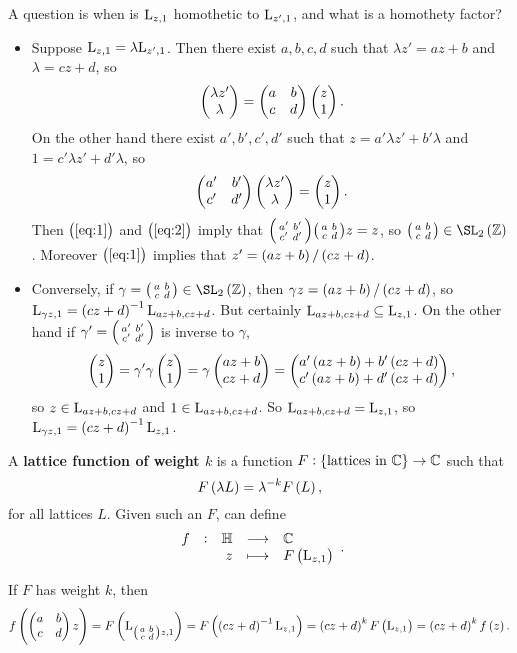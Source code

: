 A question is when is $ \mathrm{L}_{z, 1} $ homothetic to $ \mathrm{L}_{z', 1} $, and what is a homothety factor?
\begin{itemize}
\item Suppose $ \mathrm{L}_{z, 1} = \lambda \mathrm{L}_{z', 1} $. Then there exist $ a, b, c, d $ such that $ \lambda z' = az + b $ and $ \lambda = cz + d $, so
\begin{equation}
\label{eq:1}
\begin{pmatrix} \lambda z' \\ \lambda \end{pmatrix} = \begin{pmatrix} a & b \\ c & d \end{pmatrix}\begin{pmatrix} z \\ 1 \end{pmatrix}.
\end{equation}
On the other hand there exist $ a', b', c', d' $ such that $ z = a'\lambda z' + b'\lambda $ and $ 1 = c'\lambda z' + d'\lambda $, so
\begin{equation}
\label{eq:2}
\begin{pmatrix} a' & b' \\ c' & d' \end{pmatrix}\begin{pmatrix} \lambda z' \\ \lambda \end{pmatrix} = \begin{pmatrix} z \\ 1 \end{pmatrix}.
\end{equation}
Then $ \br{\ref{eq:1}} $ and $ \br{\ref{eq:2}} $ imply that $ \begin{psmallmatrix} a' & b' \\ c' & d' \end{psmallmatrix}\begin{psmallmatrix} a & b \\ c & d \end{psmallmatrix}z = z $, so $ \twobytwosmall{a}{b}{c}{d} \in \SL_2\br{\ZZ} $. Moreover $ \br{\ref{eq:1}} $ implies that $ z' = \br{az + b} / \br{cz + d} $.
\item Conversely, if $ \gamma = \twobytwosmall{a}{b}{c}{d} \in \SL_2\br{\ZZ} $, then $ \gamma z = \br{az + b} / \br{cz + d} $, so $ \L_{\gamma z, 1} = \br{cz + d}^{-1}\L_{az + b, cz + d} $. But certainly $ \mathrm{L}_{az + b, cz + d} \subseteq \mathrm{L}_{z, 1} $. On the other hand if $ \gamma' = \begin{psmallmatrix} a' & b' \\ c' & d' \end{psmallmatrix} $ is inverse to $ \gamma $,
$$ \twobyone{z}{1} = \gamma'\gamma\twobyone{z}{1} = \gamma\twobyone{az + b}{cz + d} = \twobyone{a'\br{az + b} + b'\br{cz + d}}{c'\br{az + b} + d'\br{cz + d}}, $$
so $ z \in \mathrm{L}_{az + b, cz + d} $ and $ 1 \in \mathrm{L}_{az + b, cz + d} $. So $ \mathrm{L}_{az + b, cz + d} = \mathrm{L}_{z, 1} $, so $ \L_{\gamma z, 1} = \br{cz + d}^{-1}\L_{z, 1} $.
\end{itemize}

\begin{definition}
A \textbf{lattice function of weight $ k $} is a function $ F : \cbr{\text{lattices in} \ \CC} \to \CC $ such that
$$ F\br{\lambda L} = \lambda^{-k}F\br{L}, $$
for all lattices $ L $. Given such an $ F $, can define
$$ \function[f]{\HH}{\CC}{z}{F\br{\L_{z, 1}}}. $$
\end{definition}

If $ F $ has weight $ k $, then
$$ f\br{\twobytwo{a}{b}{c}{d}z} = F\br{\L_{\twobytwosmall{a}{b}{c}{d}z, 1}} = F\br{\br{cz + d}^{-1}\L_{z, 1}} = \br{cz + d}^kF\br{\L_{z, 1}} = \br{cz + d}^kf\br{z}. $$

\pagebreak

